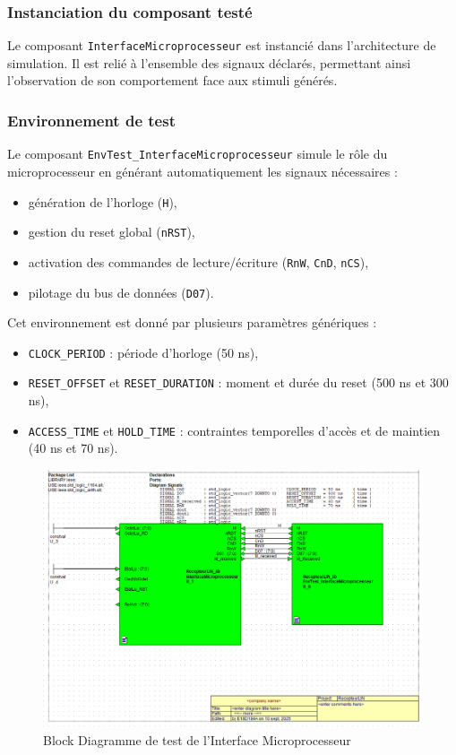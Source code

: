 \subsubsection{Instanciation du composant testé}
Le composant \texttt{InterfaceMicroprocesseur} est instancié dans l’architecture de simulation.  
Il est relié à l’ensemble des signaux déclarés, permettant ainsi l’observation de son comportement face aux stimuli générés.

\subsubsection{Environnement de test}
Le composant \texttt{EnvTest\_InterfaceMicroprocesseur} simule le rôle du microprocesseur en générant automatiquement les signaux nécessaires :
\begin{itemize}
  \item génération de l’horloge (\texttt{H}),
  \item gestion du reset global (\texttt{nRST}),
  \item activation des commandes de lecture/écriture (\texttt{RnW}, \texttt{CnD}, \texttt{nCS}),
  \item pilotage du bus de données (\texttt{D07}).
\end{itemize}

Cet environnement est donné par plusieurs paramètres génériques :
\begin{itemize}
  \item \texttt{CLOCK\_PERIOD} : période d’horloge (50 ns),
  \item \texttt{RESET\_OFFSET} et \texttt{RESET\_DURATION} : moment et durée du reset (500 ns et 300 ns),
  \item \texttt{ACCESS\_TIME} et \texttt{HOLD\_TIME} : contraintes temporelles d’accès et de maintien (40 ns et 70 ns).
\end{itemize}

\begin{figure}[H]
    \centering
    \includegraphics[width=0.95\linewidth]{images/Simulation/banc_test.png}
    \caption{Block Diagramme de test de l’Interface Microprocesseur}
    \label{fig:placeholder}
\end{figure}

